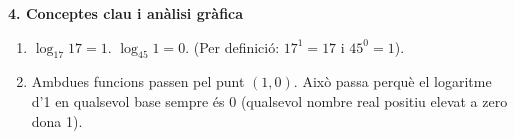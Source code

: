 \documentclass[12pt,a4paper]{article}
\begin{document}
\vspace{0.5cm}

\textbf{4. Conceptes clau i anàlisi gràfica}
\begin{enumerate}[label=\arabic*.]
    \item $\log_{17} 17 = 1$. $\log_{45} 1 = 0$. (Per definició: $17^1 = 17$ i $45^0 = 1$).
    \item Ambdues funcions passen pel punt $(1, 0)$. Això passa perquè el logaritme d'1 en qualsevol base sempre és 0 (qualsevol nombre real positiu elevat a zero dona 1).
\end{enumerate}
\end{document}
